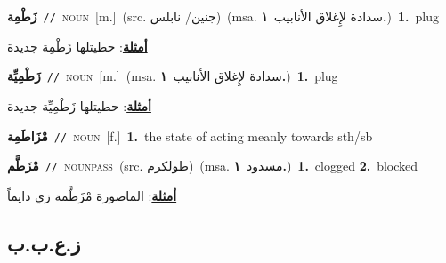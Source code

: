 \documentclass[10pt,a4paper,twoside]{article} %
\begin{document}
\begin{multicols}{2}
{\setlength\topsep{0pt}\textbf{\foreignlanguage{arabic}{زَطْمِة}}\ {\color{gray}\texttt{//}\color{black}}\ \textsc{noun}\ [m.]\ (src. \color{gray}\foreignlanguage{arabic}{جنين/ نابلس}\color{black})\ \color{gray}(msa. \foreignlanguage{arabic}{سدادة لإِغلاق الأنابيب}~\foreignlanguage{arabic}{\textbf{١.}})\color{black}\ \textbf{1.}~plug\  \begin{flushright}\color{gray}\foreignlanguage{arabic}{\textbf{\underline{\foreignlanguage{arabic}{أمثلة}}}: حطيتلها زَطْمِة جديدة}\end{flushright}\color{black}} \vspace{2mm}

{\setlength\topsep{0pt}\textbf{\foreignlanguage{arabic}{زَطْمِيِّة}}\ {\color{gray}\texttt{//}\color{black}}\ \textsc{noun}\ [m.]\ \color{gray}(msa. \foreignlanguage{arabic}{سدادة لإِغلاق الأنابيب}~\foreignlanguage{arabic}{\textbf{١.}})\color{black}\ \textbf{1.}~plug\  \begin{flushright}\color{gray}\foreignlanguage{arabic}{\textbf{\underline{\foreignlanguage{arabic}{أمثلة}}}: حطيتلها زَطْمِيِّة جديدة}\end{flushright}\color{black}} \vspace{2mm}

{\setlength\topsep{0pt}\textbf{\foreignlanguage{arabic}{مْزَاطَمِة}}\ {\color{gray}\texttt{//}\color{black}}\ \textsc{noun}\ [f.]\ \textbf{1.}~the state of acting meanly towards sth/sb\ } \vspace{2mm}

{\setlength\topsep{0pt}\textbf{\foreignlanguage{arabic}{مْزَطَّم}}\ {\color{gray}\texttt{//}\color{black}}\ \textsc{noun\textunderscore pass}\ (src. \color{gray}\foreignlanguage{arabic}{طولكرم}\color{black})\ \color{gray}(msa. \foreignlanguage{arabic}{مسدود}~\foreignlanguage{arabic}{\textbf{١.}})\color{black}\ \textbf{1.}~clogged  \textbf{2.}~blocked\  \begin{flushright}\color{gray}\foreignlanguage{arabic}{\textbf{\underline{\foreignlanguage{arabic}{أمثلة}}}: الماصورة مْزَطَّمة زي دايماً}\end{flushright}\color{black}} \vspace{2mm}

\vspace{-3mm}
\subsection*{\color{blue}\foreignlanguage{arabic}{ز.ع.ب.ب}\color{blue}{}} 


\end{multicols}
\end{document}
